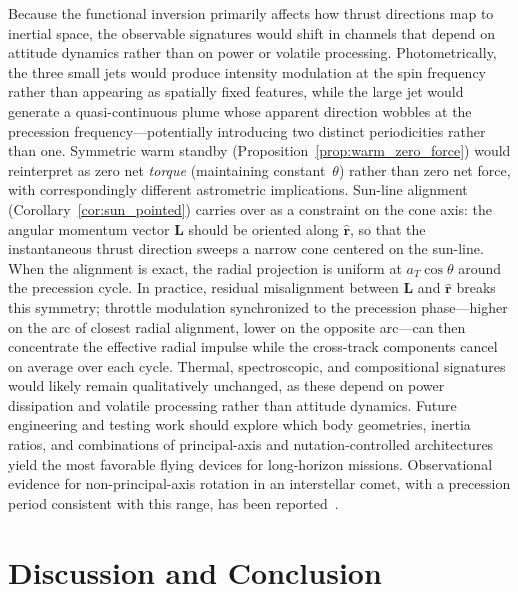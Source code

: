 \documentclass{article}
\begin{document}
Because the functional inversion primarily affects how thrust directions map
to inertial space, the observable signatures would shift in channels that
depend on attitude dynamics rather than on power or volatile processing.
Photometrically, the three small jets would produce intensity modulation at the
spin frequency rather than appearing as spatially fixed features, while the large jet would
generate a quasi-continuous plume whose apparent direction wobbles at the precession
frequency---potentially introducing two distinct periodicities rather than one. Symmetric
warm standby (Proposition~\ref{prop:warm_zero_force}) would reinterpret as zero net
\emph{torque} (maintaining constant~$\theta$) rather than zero net force, with
correspondingly different astrometric implications. Sun-line alignment (Corollary~\ref{cor:sun_pointed}) carries over as a constraint on the cone axis: the angular momentum vector $\mathbf{L}$ should be oriented along $\hat{\mathbf{r}}$, so that the instantaneous thrust direction sweeps a narrow cone centered on the sun-line. When the alignment is exact, the radial projection is uniform at $a_T\cos\theta$ around the precession cycle. In practice, residual misalignment between $\mathbf{L}$ and $\hat{\mathbf{r}}$ breaks this symmetry; throttle modulation synchronized to the precession phase---higher on the arc of closest radial alignment, lower on the opposite arc---can then concentrate the effective radial impulse while the cross-track components cancel on average over each cycle. Thermal, spectroscopic, and compositional signatures would
likely remain qualitatively unchanged, as these depend on power dissipation and volatile
processing rather than attitude dynamics. Future engineering and testing work should explore which body geometries, inertia ratios, and combinations of principal-axis and nutation-controlled architectures yield the most favorable flying devices for long-horizon missions. Observational evidence for non-principal-axis rotation in an interstellar comet, with a precession period consistent with this range, has been reported~\cite{scarmato2026wobble}.


\section{Discussion and Conclusion}
\label{sec:conclusion}
\end{document}
